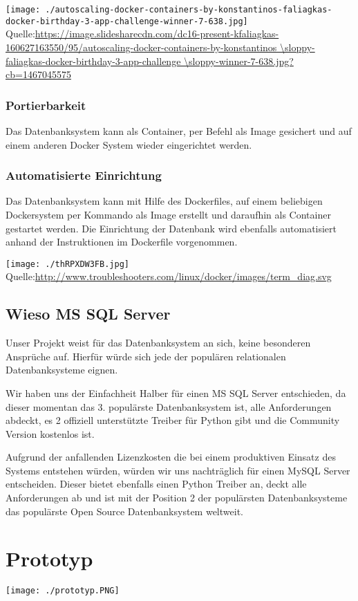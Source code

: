 \documentclass{sigchi}
\begin{document}
\texttt{[image: ./autoscaling-docker-containers-by-konstantinos-faliagkas-docker-birthday-3-app-challenge-winner-7-638.jpg]}
Quelle:\url{https://image.slidesharecdn.com/dc16-present-kfaliagkas-160627163550/95/autoscaling-docker-containers-by-konstantinos
\sloppy-faliagkas-docker-birthday-3-app-challenge
\sloppy-winner-7-638.jpg?cb=1467045575}

\subsubsection{Portierbarkeit}
Das Datenbanksystem kann als Container, per Befehl als Image gesichert und auf einem anderen Docker System wieder eingerichtet werden.

\subsubsection{Automatisierte Einrichtung}
Das Datenbanksystem kann mit Hilfe des Dockerfiles, auf einem beliebigen Dockersystem per Kommando als Image erstellt und daraufhin als Container gestartet werden. Die Einrichtung der Datenbank wird ebenfalls automatisiert anhand der Instruktionen im Dockerfile vorgenommen.

\texttt{[image: ./thRPXDW3FB.jpg]}
Quelle:\url{http://www.troubleshooters.com/linux/docker/images/term_diag.svg}

\subsection{Wieso MS SQL Server}
Unser Projekt weist für das Datenbanksystem an sich, keine besonderen Ansprüche auf. Hierfür würde sich jede der populären relationalen Datenbanksysteme eignen.

Wir haben uns der Einfachheit Halber für einen MS SQL Server entschieden, da dieser momentan das 3. populärste Datenbanksystem ist, alle Anforderungen abdeckt, es 2 offiziell unterstützte Treiber für Python gibt und die Community Version kostenlos ist. 

Aufgrund der anfallenden Lizenzkosten die bei einem produktiven Einsatz des Systems entstehen würden, würden wir uns nachträglich für einen MySQL Server entscheiden.
Dieser bietet ebenfalls einen Python Treiber an, deckt alle Anforderungen ab und ist mit der Position 2 der populärsten Datenbanksysteme das populärste Open Source Datenbanksystem weltweit.

\section{Prototyp}
\texttt{[image: ./prototyp.PNG]}
\end{document}

